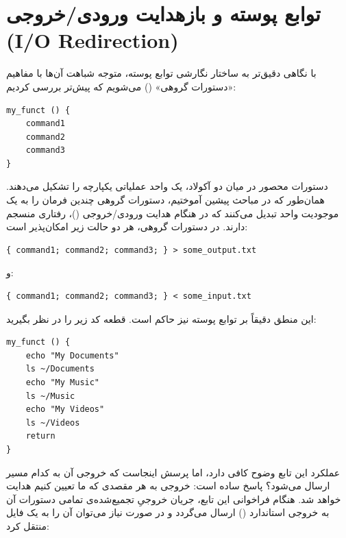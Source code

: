 \section{توابع پوسته و بازهدایت ورودی/خروجی (I/O Redirection)}

با نگاهی دقیق‌تر به ساختار نگارشی توابع پوسته، متوجه شباهت آن‌ها با مفاهیم «دستورات گروهی» () می‌شویم که پیش‌تر بررسی کردیم:

\begin{latin}
\begin{lstlisting}
my_funct () {
    command1
    command2
    command3
}
\end{lstlisting}
\end{latin}

دستورات محصور در میان دو آکولاد، یک واحد عملیاتی یکپارچه را تشکیل می‌دهند. همان‌طور که در مباحث پیشین آموختیم، دستورات گروهی چندین فرمان را به یک موجودیت واحد تبدیل می‌کنند که در هنگام هدایت ورودی/خروجی ()، رفتاری منسجم دارند. در دستورات گروهی، هر دو حالت زیر امکان‌پذیر است:

\begin{latin}
\begin{lstlisting}
{ command1; command2; command3; } > some_output.txt
\end{lstlisting}
\end{latin}

و:

\begin{latin}
\begin{lstlisting}
{ command1; command2; command3; } < some_input.txt
\end{lstlisting}
\end{latin}

این منطق دقیقاً بر توابع پوسته نیز حاکم است. قطعه کد زیر را در نظر بگیرید:

\begin{latin}
\begin{lstlisting}
my_funct () {
    echo "My Documents"
    ls ~/Documents
    echo "My Music"
    ls ~/Music
    echo "My Videos"
    ls ~/Videos
    return
}
\end{lstlisting}
\end{latin}

عملکرد این تابع وضوح کافی دارد، اما پرسش اینجاست که خروجی آن به کدام مسیر ارسال می‌شود؟ پاسخ ساده است: خروجی به هر مقصدی که ما تعیین کنیم هدایت خواهد شد. هنگام فراخوانی این تابع، جریان خروجیِ تجمیع‌شده‌ی تمامی دستورات آن به خروجی استاندارد () ارسال می‌گردد و در صورت نیاز می‌توان آن را به یک فایل منتقل کرد:


